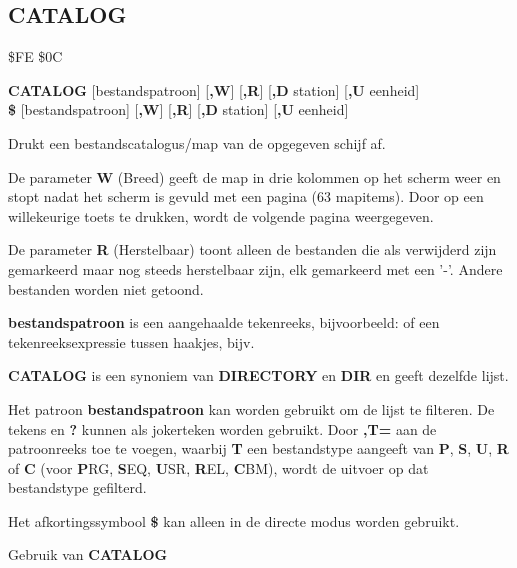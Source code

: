 \subsection{CATALOG}
\begin{description}[leftmargin=2cm,style=nextline]
\item [Token:]    \$FE \$0C

\item [Formaat:]   {\bf CATALOG} [bestandspatroon] [{\bf,W}] [{\bf,R}] [{\bf,D} station] [{\bf,U} eenheid] \\		            {\bf\$} [bestandspatroon] [{\bf,W}] [{\bf,R}] [{\bf,D} station] [{\bf,U} eenheid]

\item [Gebruik:]    Drukt een bestandscatalogus/map van de opgegeven schijf af.

                  De parameter {\bf W} (Breed) geeft de map in drie kolommen op het scherm weer en stopt nadat het scherm is gevuld met een pagina (63 mapitems). Door op een willekeurige toets te drukken, wordt de volgende pagina weergegeven.

                  De parameter {\bf R} (Herstelbaar) toont alleen de bestanden die als verwijderd zijn gemarkeerd maar nog steeds herstelbaar zijn, elk gemarkeerd met een '-'. Andere bestanden worden niet getoond.

                  {\bf bestandspatroon} is een aangehaalde tekenreeks, bijvoorbeeld:  of een tekenreeksexpressie tussen haakjes, bijv. 

                  \drivedefinition

                  \unitdefinition

\item [Opmerkingen:]  {\bf CATALOG} is een synoniem van {\bf DIRECTORY} en {\bf DIR} en geeft dezelfde lijst.

                  Het patroon {\bf bestandspatroon} kan worden gebruikt om de lijst te filteren. De tekens {\bf *} en {\bf ?} kunnen als jokerteken worden gebruikt. Door {\bf ,T=} aan de patroonreeks toe te voegen, waarbij {\bf T} een bestandstype aangeeft van {\bf P}, {\bf S}, {\bf U}, {\bf R} of {\bf C} (voor {\bf P}RG, {\bf S}EQ, {\bf U}SR, {\bf R}EL, {\bf C}BM), wordt de uitvoer op dat bestandstype gefilterd.

Het afkortingssymbool {\bf \$} kan alleen in de directe modus worden gebruikt.

\item [Voorbeelden:] Gebruik van {\bf CATALOG}


\end{description}
